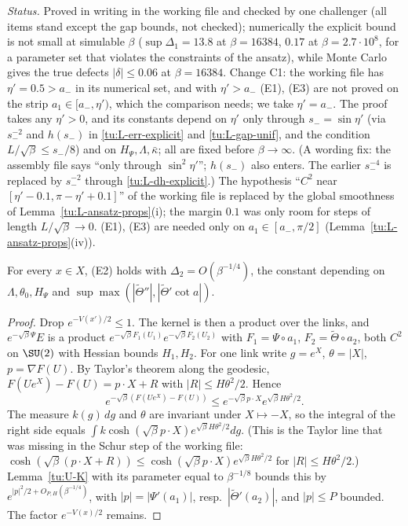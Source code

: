 \noindent\emph{Status.} Proved in writing in the working file and checked by one challenger (all items
stand except the gap bounds, not checked); numerically the explicit bound is not small at simulable $\beta$
($\sup\Delta_1=13.8$ at $\beta=16384$, $0.17$ at $\beta=2.7\cdot10^8$, for a parameter set that violates the
constraints of the ansatz), while Monte Carlo gives the true defects $|\delta|\le0.06$ at $\beta=16384$.
Change C1: the working file has $\eta'=0.5>a_-$ in its numerical set, and with $\eta'>a_-$ (E1), (E3) are not
proved on the strip $a_1\in[a_-,\eta')$, which the comparison needs; we take $\eta'=a_-$. The proof takes any
$\eta'>0$, and its constants depend on $\eta'$ only through $s_-=\sin\eta'$ (via $s_-^{-2}$ and $h(s_-)$ in
\eqref{tu:L-err-explicit} and \eqref{tu:L-gap-unif}, and the condition $L/\sqrt\beta\le s_-/8$) and on $H_\Psi,\Lambda,\bar\kappa$; all are fixed before $\beta\to\infty$. (A wording fix: the assembly
file says ``only through $\sin^2\eta'$''; $h(s_-)$ also enters. The earlier $s_-^{-4}$ is replaced by $s_-^{-2}$ through
\eqref{tu:L-dh-explicit}.) The hypothesis ``$C^2$ near
$[\eta'-0.1,\pi-\eta'+0.1]$'' of the working file is replaced by the global smoothness of
Lemma~\ref{tu:L-ansatz-props}(i); the margin $0.1$ was only room for steps of length $L/\sqrt\beta\to0$.
(E1), (E3) are needed only on $a_1\in[a_-,\pi/2]$ (Lemma~\ref{tu:L-ansatz-props}(iv)).

\begin{lemma}[(E2)]\label{tu:L-E2}
For every $x\in X$, (E2) holds with $\Delta_2=O(\beta^{-1/4})$, the constant depending on
$\Lambda,\theta_0,H_\Psi$ and $\sup\max(|\tilde\Theta''|,|\tilde\Theta'\cot a|)$.
\end{lemma}

\begin{proof}
Drop $e^{-V(x')/2}\le1$. The kernel is then a product over the links, and $e^{-\sqrt\beta\Psi}E$ is a product
$e^{-\sqrt\beta F_1(U_1)}e^{-\sqrt\beta F_2(U_2)}$ with $F_1=\Psi\circ a_1$, $F_2=\tilde\Theta\circ a_2$, both $C^2$ on
$\SU(2)$ with Hessian bounds $H_1,H_2$. For one link write $g=e^X$, $\theta=|X|$, $p=\nabla F(U)$. By Taylor's
theorem along the geodesic, $F(Ue^X)-F(U)=p\cdot X+R$ with $|R|\le H\theta^2/2$. Hence
\[
e^{-\sqrt\beta(F(Ue^X)-F(U))}\le e^{-\sqrt\beta p\cdot X}e^{\sqrt\beta H\theta^2/2}.
\]
The measure $k(g)\,dg$ and $\theta$ are invariant under $X\mapsto-X$, so the integral of the right side equals
$\int k\cosh(\sqrt\beta p\cdot X)e^{\sqrt\beta H\theta^2/2}dg$. (This is the Taylor line that was missing in the
Schur step of the working file: $\cosh(\sqrt\beta(p\cdot X+R))\le\cosh(\sqrt\beta p\cdot X)e^{\sqrt\beta H\theta^2/2}$
for $|R|\le H\theta^2/2$.) Lemma~\ref{tu:U-K} with its parameter equal to $\beta^{-1/8}$ bounds this by
$e^{|p|^2/2+O_{P,H}(\beta^{-1/4})}$, with $|p|=|\Psi'(a_1)|$, resp.\ $|\tilde\Theta'(a_2)|$, and $|p|\le P$ bounded.
The factor $e^{-V(x)/2}$ remains.
\end{proof}

